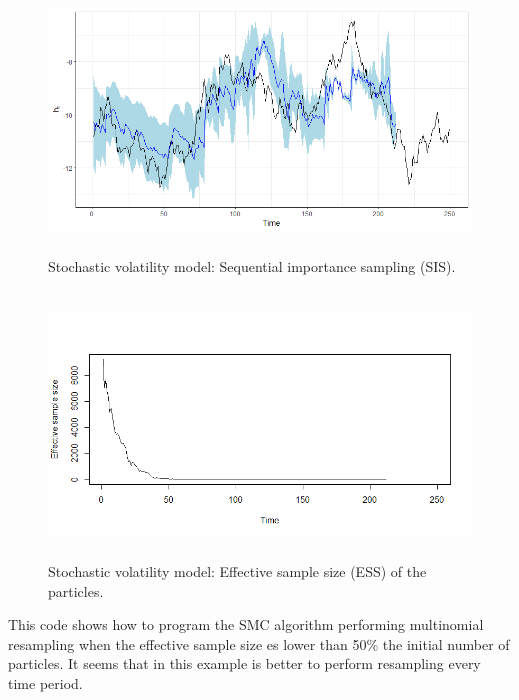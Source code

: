 \begin{enumerate}[leftmargin=*]
\begin{figure}[!h]
	\includegraphics[width=340pt, height=200pt]{Chapters/chapter8/figures/SIS.png}
	\caption[List of figure caption goes here]{Stochastic volatility model: Sequential importance sampling (SIS).}\label{figSIS}
\end{figure}

\begin{figure}[!h]
	\includegraphics[width=340pt, height=200pt]{Chapters/chapter8/figures/ESSsis.png}
	\caption[List of figure caption goes here]{Stochastic volatility model: Effective sample size (ESS) of the particles.}\label{figESS}
\end{figure} 

This code shows how to program the SMC algorithm performing multinomial resampling when the effective sample size es lower than 50\% the initial number of particles. It seems that in this example is better to perform resampling every time period.


\end{enumerate}
